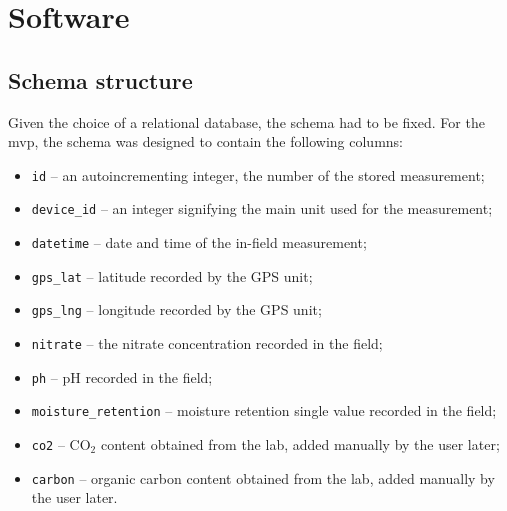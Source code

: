 \section{Software} 
\tocless \subsection{Schema structure} \label{schema_struct}

Given the choice of a relational database, the schema had to be fixed. For the \gls{mvp}, the schema was designed to contain the following columns: 
\begin{itemize}
    \item \texttt{id} -- an autoincrementing integer, the number of the stored measurement;
    \item \texttt{device\_id} -- an integer signifying the main unit used for the measurement;
    \item \texttt{datetime} -- date and time of the in-field measurement;
    \item \texttt{gps\_lat} -- latitude recorded by the GPS unit;
    \item \texttt{gps\_lng} -- longitude recorded by the GPS unit;
    \item \texttt{nitrate} -- the nitrate concentration recorded in the field;
    \item \texttt{ph} -- pH recorded in the field;
    \item \texttt{moisture\_retention} -- moisture retention single value recorded in the field;
    \item \texttt{co2} -- CO$_2$ content obtained from the lab, added manually by the user later;
    \item \texttt{carbon} -- organic carbon content obtained from the lab, added manually by the user later.
\end{itemize}